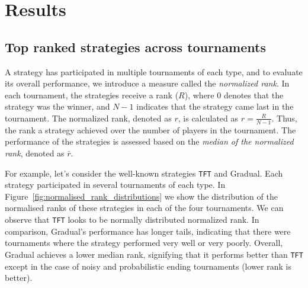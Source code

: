 \documentclass{article}
\def\TFT{\texttt{TFT}}
\begin{document}
\section{Results}
\subsection{Top ranked strategies across tournaments}\label{section:top_performances}

A strategy has participated in multiple tournaments of each type, and to
evaluate its overall performance, we introduce a measure called the {\it
normalized rank}. In each tournament, the strategies receive a rank (\(R\)), where 0
denotes that the strategy was the winner, and \(N-1\) indicates that the
strategy came last in the tournament. The normalized rank, denoted as \(r\), is
calculated as \(r = \frac{R}{N-1}\). Thus, the rank a strategy achieved over the
number of players in the tournament. The performance of the strategies is
assessed based on the {\it median of the normalized rank}, denoted as
\(\bar{r}\).

For example, let's consider the well-known strategies \TFT{} and Gradual. Each
strategy participated in several tournaments of each type. In
Figure~\ref{fig:normalised_rank_distributions} we show the distribution of the
normalised ranks of these strategies in each of the four tournaments. We can
observe that \TFT{} looks to be normally distributed normalized rank. In comparison,
Gradual's performance has longer tails, indicating that there were tournaments
where the strategy performed very well or very poorly. Overall, Gradual achieves
a lower median rank, signifying that it performs better than \TFT{} except in
the case of noisy and probabilistic ending tournaments (lower rank is better).
\end{document}
